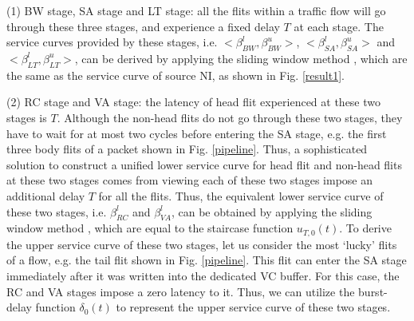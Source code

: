 \documentclass[preprint]{elsarticle}
\begin{document}
(1) BW stage, SA stage and LT stage: all the flits within a traffic flow will go through these three stages, and experience a fixed delay $T$ at each stage. The service curves provided by these stages, i.e. $<\beta^l_{BW},\beta^u_{BW}>$, $<\beta^l_{SA},\beta^u_{SA}>$ and $<\beta^l_{LT},\beta^u_{LT}>$, can be derived by applying the sliding window method \cite{1253607}, which are the same as the service curve of source NI, as shown in Fig. \ref{result1}.

(2) RC stage and VA stage: the latency of head flit experienced at these two stages is $T$. Although the non-head flits do not go through these two stages, they have to wait for at most two cycles before entering the SA stage, e.g. the first three body flits of a packet shown in Fig. \ref{pipeline}. Thus, a sophisticated solution to construct a unified lower service curve for head flit and non-head flits at these two stages comes from viewing each of these two stages impose an additional delay $T$ for all the flits. Thus, the equivalent lower service curve of these two stages, i.e. $\beta^l_{RC}$ and $\beta^l_{VA}$, can be obtained by applying the sliding window method \cite{1253607}, which are equal to the staircase function $u_{T,0}(t)$. To derive the upper service curve of these two stages, let us consider the most `lucky' flits of a flow, e.g. the tail flit shown in Fig. \ref{pipeline}. This flit can enter the SA stage immediately after it was written into the dedicated VC buffer. For this case, the RC and VA stages impose a zero latency to it. Thus, we can utilize the burst-delay function $\delta_0(t)$ to represent the upper service curve of these two stages.
\end{document}
